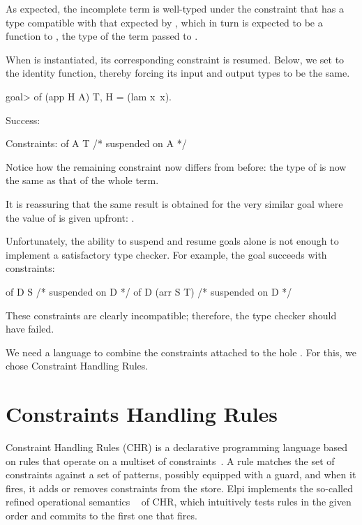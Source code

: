 \documentclass[a4paper, 11pt]{book}
\begin{document}
As expected, the incomplete term is well-typed under the constraint that
 has a type compatible with that expected by , which in turn
is expected to be a function to , the type of the term passed to
.

When  is instantiated, its corresponding constraint is resumed.
Below, we set  to the identity function, thereby forcing its input
and output types to be the same.

\begin{elpicode}
goal> of (app H A) T, H = (lam x\ x).

Success:

Constraints:
  of A T  /* suspended on A */
\end{elpicode}


Notice how the remaining constraint now differs from before: the type of
 is now the same  as that of the whole term.

It is reassuring that the same result is obtained for the very similar goal
where the value of  is given upfront: .

Unfortunately, the ability to suspend and resume goals alone is not enough to
implement a satisfactory type checker. For example, the goal
 succeeds with constraints:

\begin{elpicode}
  of D S  /* suspended on D */
  of D (arr S T)  /* suspended on D */
\end{elpicode}


These constraints are clearly incompatible; therefore, the type checker
should have failed.

We need a language to combine the constraints attached to the hole
. For this, we chose Constraint Handling Rules.

\section{Constraints Handling Rules}\label{sec:chrui}


Constraint Handling Rules (CHR) is a declarative programming language based
on rules that operate on a multiset of constraints~\cite{chr}. A rule matches
the set of constraints against a set of patterns, possibly equipped with a
guard, and when it fires, it adds or removes constraints from the store.
Elpi implements the so-called refined operational semantics
~\cite{10.1007/978-3-540-27775-0_7} of CHR, which intuitively tests rules in
the given order and commits to the first one that fires.
\end{document}
